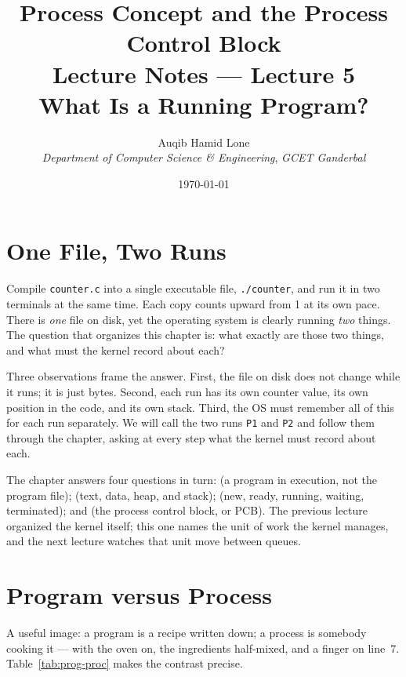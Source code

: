 \documentclass[11pt]{article}
\title{Process Concept and the Process Control Block\\\large Lecture Notes --- Lecture 5\\
  \normalsize What Is a Running Program?}
\author{Auqib Hamid Lone\\[0.3em]
  \emph{Department of Computer Science \& Engineering}, \emph{GCET Ganderbal}}
\date{\today}
\begin{document}
\maketitle

\section{One File, Two Runs}

Compile \texttt{counter.c} into a single executable file, \texttt{./counter},
and run it in two terminals at the same time. Each copy counts upward from 1 at
its own pace. There is \emph{one} file on disk, yet the operating system is
clearly running \emph{two} things. The question that organizes this chapter is:
what exactly are those two things, and what must the kernel record about each?

Three observations frame the answer. First, the file on disk does not change
while it runs; it is just bytes. Second, each run has its own counter value, its
own position in the code, and its own stack. Third, the OS must remember all of
this for each run separately. We will call the two runs \texttt{P1} and
\texttt{P2} and follow them through the chapter, asking at every step what the
kernel must record about each.

The chapter answers four questions in turn:  (a program
in execution, not the program file);  (text, data, heap, and stack); 
(new, ready, running, waiting, terminated); and  (the process control block, or PCB). The previous lecture
organized the kernel itself; this one names the unit of work the kernel
manages, and the next lecture watches that unit move between queues.

\section{Program versus Process}

\noindent{}

A useful image: a program is a recipe written down; a process is somebody
cooking it --- with the oven on, the ingredients half-mixed, and a finger on
line~7. Table~\ref{tab:prog-proc} makes the contrast precise.
\end{document}
